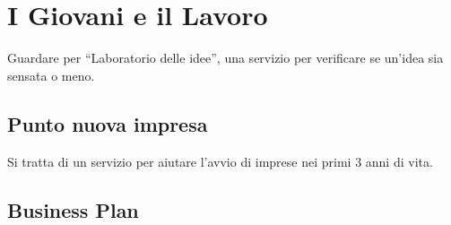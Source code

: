 \providecommand{\main}{.}






{\hypersetup{hidelinks}
  \tableofcontents  %
}

\chapter{I Giovani e il Lavoro}
Guardare per ``Laboratorio delle idee'', una servizio per verificare se un'idea sia sensata o meno.

\section{Punto nuova impresa}
Si tratta di un servizio per aiutare l'avvio di imprese nei primi 3 anni di vita.

\section{Business Plan}

